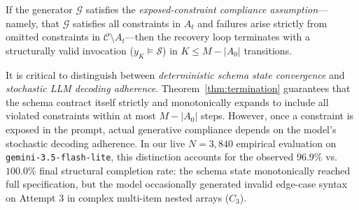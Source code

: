 \begin{proposition}
If the generator $\mathcal{G}$ satisfies the \emph{exposed-constraint compliance assumption}---namely, that $\mathcal{G}$ satisfies all constraints in $A_t$ and failures arise strictly from omitted constraints in $\mathcal{C} \setminus A_t$---then the recovery loop terminates with a structurally valid invocation ($y_K \models \mathcal{S}$) in $K \le M - |A_0|$ transitions.
\end{proposition}

\begin{remark}
It is critical to distinguish between \emph{deterministic schema state convergence} and \emph{stochastic LLM decoding adherence}. Theorem~\ref{thm:termination} guarantees that the schema contract itself strictly and monotonically expands to include all violated constraints within at most $M - |A_0|$ steps. However, once a constraint is exposed in the prompt, actual generative compliance depends on the model's stochastic decoding adherence. In our live $N=3,840$ empirical evaluation on \texttt{gemini-3.5-flash-lite}, this distinction accounts for the observed $96.9\%$ vs.\ $100.0\%$ final structural completion rate: the schema state monotonically reached full specification, but the model occasionally generated invalid edge-case syntax on Attempt 3 in complex multi-item nested arrays ($C_3$).
\end{remark}


